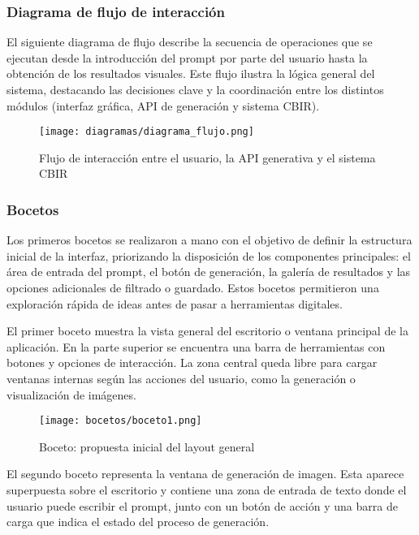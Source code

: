\subsubsection{Diagrama de flujo de interacción}
El siguiente diagrama de flujo describe la secuencia de operaciones que se ejecutan desde la introducción del prompt por parte del usuario hasta la obtención de los resultados visuales. Este flujo ilustra la lógica general del sistema, destacando las decisiones clave y la coordinación entre los distintos módulos (interfaz gráfica, API de generación y sistema CBIR).

\begin{figure}[H]
    \centering
    \texttt{[image: diagramas/diagrama\_flujo.png]}
    \caption{Flujo de interacción entre el usuario, la API generativa y el sistema CBIR}
    \label{fig:flujo-interaccion}
\end{figure}

\subsubsection{Bocetos}

Los primeros bocetos se realizaron a mano con el objetivo de definir la estructura inicial de la interfaz, priorizando la disposición de los componentes principales: el área de entrada del prompt, el botón de generación, la galería de resultados y las opciones adicionales de filtrado o guardado. Estos bocetos permitieron una exploración rápida de ideas antes de pasar a herramientas digitales.

El primer boceto muestra la vista general del escritorio o ventana principal de la aplicación. En la parte superior se encuentra una barra de herramientas con botones y opciones de interacción. La zona central queda libre para cargar ventanas internas según las acciones del usuario, como la generación o visualización de imágenes.

\begin{figure}[H]
    \centering
    \texttt{[image: bocetos/boceto1.png]}
    \caption{Boceto: propuesta inicial del layout general}
    \label{fig:boceto1}
\end{figure}

El segundo boceto representa la ventana de generación de imagen. Esta aparece superpuesta sobre el escritorio y contiene una zona de entrada de texto donde el usuario puede escribir el prompt, junto con un botón de acción y una barra de carga que indica el estado del proceso de generación.

